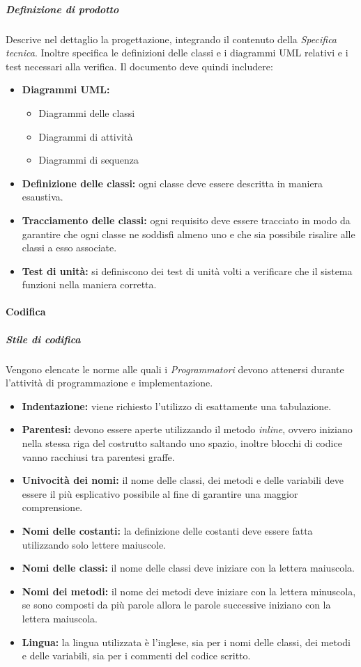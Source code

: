 \subparagraph{Definizione di prodotto}
Descrive nel dettaglio la progettazione, integrando il contenuto della \textit{Specifica tecnica}. Inoltre specifica le definizioni delle classi e i diagrammi UML relativi e i test necessari alla verifica. Il documento deve quindi includere:
\begin{itemize}
	\item \textbf{Diagrammi UML:}
	\begin{itemize}
		\item Diagrammi delle classi
		\item Diagrammi di attività
		\item Diagrammi di sequenza
	\end{itemize}
	\item \textbf{Definizione delle classi:} ogni classe deve essere descritta in maniera esaustiva.
	\item \textbf{Tracciamento delle classi:} ogni requisito deve essere tracciato in modo da garantire che ogni classe ne soddisfi almeno uno e che sia possibile risalire alle classi a esso associate.
	\item \textbf{Test di unità:} si definiscono dei test di unità volti a verificare che il sistema funzioni nella maniera corretta.
\end{itemize}

\paragraph{Codifica}
\subparagraph{Stile di codifica}
Vengono elencate le norme alle quali i \textit{Programmatori} devono attenersi durante l'attività di programmazione e implementazione.
\begin{itemize}
	\item \textbf{Indentazione:} viene richiesto l'utilizzo di esattamente una tabulazione.
	\item \textbf{Parentesi:} devono essere aperte utilizzando il metodo \textit{inline}, ovvero iniziano nella stessa riga del costrutto saltando uno spazio, inoltre blocchi di codice vanno racchiusi tra parentesi graffe.
	\item \textbf{Univocità dei nomi:} il nome delle classi, dei metodi e delle variabili deve essere il più esplicativo possibile al fine di garantire una maggior comprensione.
	\item \textbf{Nomi delle costanti:} la definizione delle costanti deve essere fatta utilizzando solo lettere maiuscole.
	\item \textbf{Nomi delle classi:} il nome delle classi deve iniziare con la lettera maiuscola.
	\item \textbf{Nomi dei metodi:} il nome dei metodi deve iniziare con la lettera minuscola, se sono composti da più parole allora le parole successive iniziano con la lettera maiuscola.
	\item \textbf{Lingua:} la lingua utilizzata è l'inglese, sia per i nomi delle classi, dei metodi e delle variabili, sia per i commenti del codice scritto.
\end{itemize}

